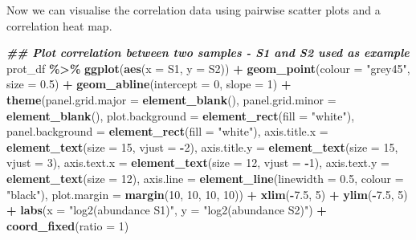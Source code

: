 \documentclass[9pt,a4paper,]{extarticle}
\newenvironment{Shaded}{\begin{snugshade}}{\end{snugshade}}
\newcommand{\AttributeTok}[1]{\textcolor[rgb]{0.13,0.29,0.53}{#1}}
\newcommand{\DecValTok}[1]{\textcolor[rgb]{0.00,0.00,0.81}{#1}}
\newcommand{\DocumentationTok}[1]{\textcolor[rgb]{0.56,0.35,0.01}{\textbf{\textit{#1}}}}
\newcommand{\FloatTok}[1]{\textcolor[rgb]{0.00,0.00,0.81}{#1}}
\newcommand{\FunctionTok}[1]{\textcolor[rgb]{0.13,0.29,0.53}{\textbf{#1}}}
\newcommand{\NormalTok}[1]{#1}
\newcommand{\SpecialCharTok}[1]{\textcolor[rgb]{0.81,0.36,0.00}{\textbf{#1}}}
\newcommand{\StringTok}[1]{\textcolor[rgb]{0.31,0.60,0.02}{#1}}
\begin{document}
Now we can visualise the correlation data using pairwise scatter plots and a
correlation heat map.

\begin{Shaded}
\begin{Highlighting}[]
\DocumentationTok{\#\# Plot correlation between two samples {-} S1 and S2 used as example}
\NormalTok{prot\_df }\SpecialCharTok{\%\textgreater{}\%}
  \FunctionTok{ggplot}\NormalTok{(}\FunctionTok{aes}\NormalTok{(}\AttributeTok{x =}\NormalTok{ S1, }\AttributeTok{y =}\NormalTok{ S2)) }\SpecialCharTok{+}
  \FunctionTok{geom\_point}\NormalTok{(}\AttributeTok{colour =} \StringTok{"grey45"}\NormalTok{, }\AttributeTok{size =} \FloatTok{0.5}\NormalTok{) }\SpecialCharTok{+}
  \FunctionTok{geom\_abline}\NormalTok{(}\AttributeTok{intercept =} \DecValTok{0}\NormalTok{, }\AttributeTok{slope =} \DecValTok{1}\NormalTok{) }\SpecialCharTok{+}
  \FunctionTok{theme}\NormalTok{(}\AttributeTok{panel.grid.major =} \FunctionTok{element\_blank}\NormalTok{(), }
        \AttributeTok{panel.grid.minor =} \FunctionTok{element\_blank}\NormalTok{(),}
        \AttributeTok{plot.background =} \FunctionTok{element\_rect}\NormalTok{(}\AttributeTok{fill =} \StringTok{"white"}\NormalTok{),}
        \AttributeTok{panel.background =} \FunctionTok{element\_rect}\NormalTok{(}\AttributeTok{fill =} \StringTok{"white"}\NormalTok{),}
        \AttributeTok{axis.title.x =} \FunctionTok{element\_text}\NormalTok{(}\AttributeTok{size =} \DecValTok{15}\NormalTok{, }\AttributeTok{vjust =} \SpecialCharTok{{-}}\DecValTok{2}\NormalTok{),}
        \AttributeTok{axis.title.y =} \FunctionTok{element\_text}\NormalTok{(}\AttributeTok{size =} \DecValTok{15}\NormalTok{, }\AttributeTok{vjust =} \DecValTok{3}\NormalTok{),}
        \AttributeTok{axis.text.x =} \FunctionTok{element\_text}\NormalTok{(}\AttributeTok{size =} \DecValTok{12}\NormalTok{, }\AttributeTok{vjust =} \SpecialCharTok{{-}}\DecValTok{1}\NormalTok{),}
        \AttributeTok{axis.text.y =} \FunctionTok{element\_text}\NormalTok{(}\AttributeTok{size =} \DecValTok{12}\NormalTok{),}
        \AttributeTok{axis.line =} \FunctionTok{element\_line}\NormalTok{(}\AttributeTok{linewidth =} \FloatTok{0.5}\NormalTok{, }\AttributeTok{colour =} \StringTok{"black"}\NormalTok{),}
        \AttributeTok{plot.margin =} \FunctionTok{margin}\NormalTok{(}\DecValTok{10}\NormalTok{, }\DecValTok{10}\NormalTok{, }\DecValTok{10}\NormalTok{, }\DecValTok{10}\NormalTok{)) }\SpecialCharTok{+}
  \FunctionTok{xlim}\NormalTok{(}\SpecialCharTok{{-}}\FloatTok{7.5}\NormalTok{, }\DecValTok{5}\NormalTok{) }\SpecialCharTok{+}
  \FunctionTok{ylim}\NormalTok{(}\SpecialCharTok{{-}}\FloatTok{7.5}\NormalTok{, }\DecValTok{5}\NormalTok{) }\SpecialCharTok{+}
  \FunctionTok{labs}\NormalTok{(}\AttributeTok{x =} \StringTok{"log2(abundance S1)"}\NormalTok{, }\AttributeTok{y =} \StringTok{"log2(abundance S2)"}\NormalTok{) }\SpecialCharTok{+}
  \FunctionTok{coord\_fixed}\NormalTok{(}\AttributeTok{ratio =} \DecValTok{1}\NormalTok{)}
\end{Highlighting}
\end{Shaded}
\end{document}
